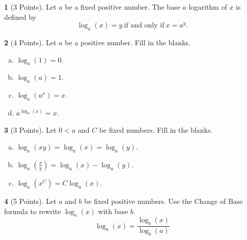 \documentclass[12pt]{amsart}
\theoremstyle{definition}
\newtheorem{thm}{}
\begin{document}
\begin{thm}[3 Points]
  Let $a$ be a fixed positive number.
  The base $a$ logarithm of $x$ is defined by
  \vspace{.25in}
  $$\log_a(x) = y\  \text{if and only if}\ x = a^y.$$
\end{thm}

\begin{thm}[4 Points]
  Let $a$ be a positive number.  Fill in the blanks.
  \begin{enumerate}[(a)]
  \item
    \vspace{.25in}
    $\displaystyle{\log_a(1) = 0}$.
    \vspace{.25in}
  \item
    $\displaystyle{\log_a(a) = 1}$.
    \vspace{.25in}
  \item
    $\displaystyle{\log_a(a^x) = x}$.
    \vspace{.25in}
  \item
    $\displaystyle{a^{\log_a(x)} = x}$.
  \end{enumerate}
  \vspace{.5in}
\end{thm}

\begin{thm}[3 Points]
  Let $0 < a$ and $C$ be fixed numbers.  Fill in the blanks.
  \begin{enumerate}[(a)]
  \item
    \vspace{.25in}
    $\displaystyle{\log_a(xy) = \log_a(x) = \log_a(y)}$.
    \vspace{.25in}
  \item
    $\displaystyle{\log_a\left(\frac{x}{y}\right) = \log_a(x) - \log_a(y)}$.
    \vspace{.25in}
  \item
    $\displaystyle{\log_a(x^C) = C\log_a(x)}$.
  \end{enumerate}
  \vspace{.25in}
\end{thm}

\begin{thm}[5 Points]
  Let $a$ and $b$ be fixed positive numbers.
  Use the Change of Base formula to rewrite $\log_a(x)$ with base $b$.
  \vspace{.12in}
  $$\log_a(x) = \frac{\log_b(x)}{\log_b(a)}$$
  \vspace{.12in}
\end{thm}
\end{document}
